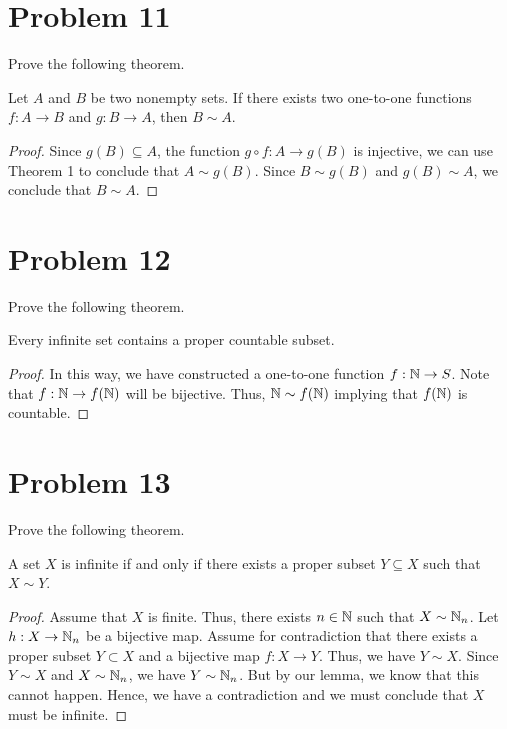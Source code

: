 \documentclass[11pt,a4paper]{article}
\begin{document}
\section{Problem 11} Prove the following theorem.
\begin{theorem}
    Let \( A  \) and \( B  \) be two nonempty sets. If there exists two one-to-one functions \( f: A \to B  \) and \( g: B \to A  \), then \( B \sim A  \).
\end{theorem}
\begin{proof}
Since \( g(B) \subseteq  A  \), the function \( g \circ f : A \to g(B)  \) is injective, we can use Theorem 1 to conclude that \( A \sim g(B) \). Since \( B \sim g(B) \) and \( g(B) \sim A  \), we conclude that \( B \sim A  \).
\end{proof}

\section{Problem 12} Prove the following theorem.

\begin{theorem}[ ]
    Every infinite set contains a proper countable subset.
\end{theorem}
\begin{proof}
    In this way, we have constructed a one-to-one function \( f: \mathbb{N} \to S  \). Note that \( f: \mathbb{N} \to f(\mathbb{N}) \) will be bijective. Thus, \( \mathbb{N} \sim f(\mathbb{N}) \) implying that \( f(\mathbb{N}) \) is countable.
\end{proof}

\section{Problem 13} Prove the following theorem.

\begin{theorem}[ ]
    A set \( X  \) is infinite if and only if there exists a proper subset \( Y \subseteq  X  \) such that \( X \sim Y  \).
\end{theorem}

\begin{proof}
Assume that \( X  \) is finite. Thus, there exists \( n \in \mathbb{N}  \) such that \( X \sim {\ensuremath{\mathbb{N}}}_{n} \). Let \( h: X \to {\ensuremath{\mathbb{N}}}_{n} \) be a bijective map. Assume for contradiction that there exists a proper subset \( Y \subset X  \) and a bijective map \( f: X \to Y  \). Thus, we have \( Y \sim X  \). Since \( Y \sim X  \) and \( X \sim {\ensuremath{\mathbb{N}}}_{n} \), we have \( Y \sim {\ensuremath{\mathbb{N}}}_{n} \). But by our lemma, we know that this cannot happen. Hence, we have a contradiction and we must conclude that \( X  \) must be infinite.
\end{proof}
\end{document}
